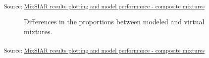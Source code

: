 \documentclass[
  number]{elsarticle}
\begin{document}
\textsubscript{Source:
\href{https://alex-koiter.github.io/sampling-design-manuscript/notebooks/Mixture_plots_all-preview.html\#cell-fig-unmixing-plot}{MixSIAR
results plotting and model performance - composite mixtures}}

\begin{figure}[H]


\caption{\label{fig-unmixing-diff-plot}Differences in the proportions
between modeled and virtual mixtures.}

\end{figure}%

\textsubscript{Source:
\href{https://alex-koiter.github.io/sampling-design-manuscript/notebooks/Mixture_plots_all-preview.html\#cell-fig-unmixing-diff-plot}{MixSIAR
results plotting and model performance - composite mixtures}}
\end{document}
